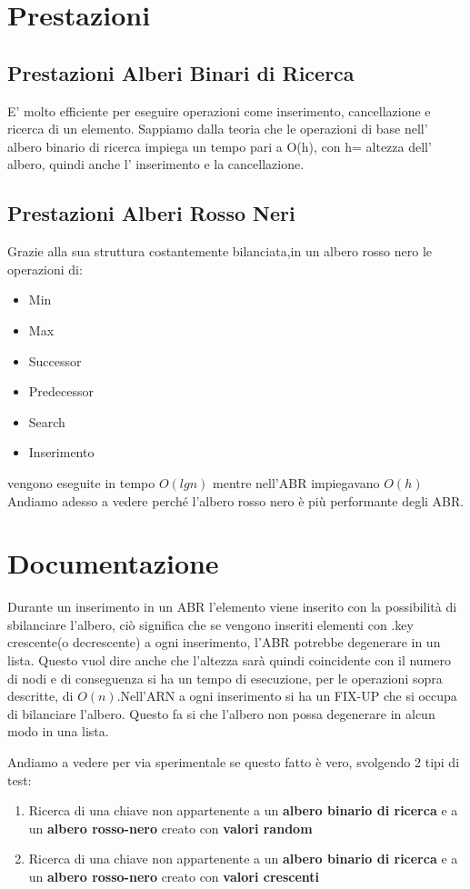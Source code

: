 \documentclass[12pt]{article}
\begin{document}
\noindent

\section{Prestazioni}
\subsection{Prestazioni Alberi Binari di Ricerca}

E' molto efficiente per eseguire operazioni come inserimento, cancellazione e ricerca di un elemento.
Sappiamo dalla teoria che le operazioni di base nell' albero binario di ricerca impiega un tempo pari a O(h), 
con h= altezza dell' albero, quindi anche l' inserimento e la cancellazione.
\subsection{Prestazioni Alberi Rosso Neri}
Grazie alla sua struttura costantemente bilanciata,in un albero rosso nero le operazioni di:
\begin{itemize}
\item Min
\item Max
\item Successor
\item Predecessor
\item Search 
\item Inserimento
\end{itemize}
\noindent
vengono eseguite in tempo $O(lg n)$ mentre nell'ABR impiegavano $O(h)$
Andiamo adesso a vedere perché l'albero rosso nero è più performante degli ABR.
\section{Documentazione}

Durante un inserimento in un ABR l'elemento viene inserito con la possibilità di sbilanciare l'albero, ciò significa che se vengono inseriti elementi con .key crescente(o decrescente) a ogni inserimento, l'ABR potrebbe degenerare in un lista. Questo vuol dire anche che l'altezza sarà quindi coincidente con il numero di nodi e di conseguenza si ha un tempo di esecuzione, per le operazioni sopra descritte, di $O(n)$.Nell'ARN a ogni inserimento si ha un FIX-UP che si occupa di bilanciare l'albero. Questo fa si che l'albero non possa
degenerare in alcun modo in una lista.

\noindent
Andiamo a vedere per via sperimentale se questo fatto è vero, svolgendo 2 tipi di test:
\begin{enumerate}
\item Ricerca di una chiave non appartenente a un \textbf{albero binario di ricerca} e a un \textbf{albero rosso-nero} creato con \textbf{valori random}

\item Ricerca di una chiave non appartenente a un \textbf{albero binario di ricerca} e a un \textbf{albero rosso-nero} creato con \textbf{valori crescenti}
\end{enumerate}
\end{document}
